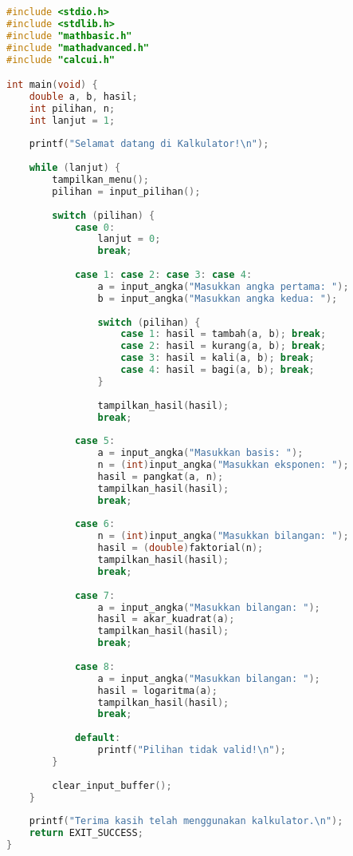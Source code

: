 \documentclass[../main.tex]{subfiles}
\begin{document}
\begin{lstlisting}[language=C, caption={kalkulator.c - program utama}]
#include <stdio.h>
#include <stdlib.h>
#include "mathbasic.h"
#include "mathadvanced.h"
#include "calcui.h"

int main(void) {
    double a, b, hasil;
    int pilihan, n;
    int lanjut = 1;
    
    printf("Selamat datang di Kalkulator!\n");
    
    while (lanjut) {
        tampilkan_menu();
        pilihan = input_pilihan();
        
        switch (pilihan) {
            case 0:
                lanjut = 0;
                break;
                
            case 1: case 2: case 3: case 4:
                a = input_angka("Masukkan angka pertama: ");
                b = input_angka("Masukkan angka kedua: ");
                
                switch (pilihan) {
                    case 1: hasil = tambah(a, b); break;
                    case 2: hasil = kurang(a, b); break;
                    case 3: hasil = kali(a, b); break;
                    case 4: hasil = bagi(a, b); break;
                }
                
                tampilkan_hasil(hasil);
                break;
                
            case 5:
                a = input_angka("Masukkan basis: ");
                n = (int)input_angka("Masukkan eksponen: ");
                hasil = pangkat(a, n);
                tampilkan_hasil(hasil);
                break;
                
            case 6:
                n = (int)input_angka("Masukkan bilangan: ");
                hasil = (double)faktorial(n);
                tampilkan_hasil(hasil);
                break;
                
            case 7:
                a = input_angka("Masukkan bilangan: ");
                hasil = akar_kuadrat(a);
                tampilkan_hasil(hasil);
                break;
                
            case 8:
                a = input_angka("Masukkan bilangan: ");
                hasil = logaritma(a);
                tampilkan_hasil(hasil);
                break;
                
            default:
                printf("Pilihan tidak valid!\n");
        }
        
        clear_input_buffer();
    }
    
    printf("Terima kasih telah menggunakan kalkulator.\n");
    return EXIT_SUCCESS;
}
\end{lstlisting}
\end{document}
